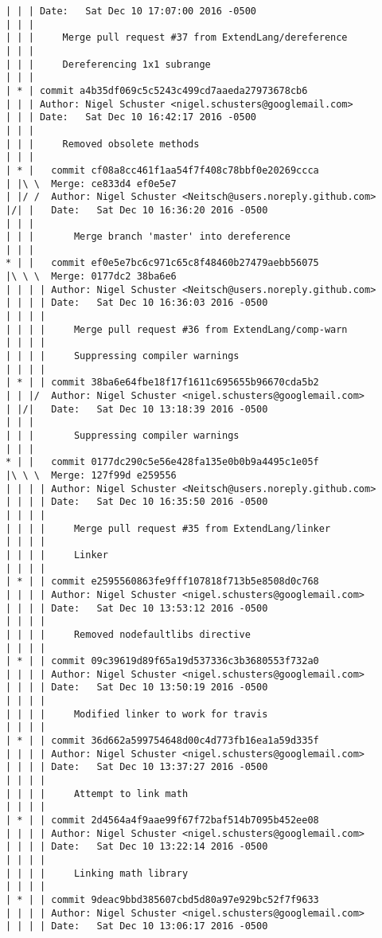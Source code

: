 \begin{lstlisting}
| | | Date:   Sat Dec 10 17:07:00 2016 -0500
| | | 
| | |     Merge pull request #37 from ExtendLang/dereference
| | |     
| | |     Dereferencing 1x1 subrange
| | |    
| * | commit a4b35df069c5c5243c499cd7aaeda27973678cb6
| | | Author: Nigel Schuster <nigel.schusters@googlemail.com>
| | | Date:   Sat Dec 10 16:42:17 2016 -0500
| | | 
| | |     Removed obsolete methods
| | |      
| * |   commit cf08a8cc461f1aa54f7f408c78bbf0e20269ccca
| |\ \  Merge: ce833d4 ef0e5e7
| |/ /  Author: Nigel Schuster <Neitsch@users.noreply.github.com>
|/| |   Date:   Sat Dec 10 16:36:20 2016 -0500
| | |   
| | |       Merge branch 'master' into dereference
| | |      
* | |   commit ef0e5e7bc6c971c65c8f48460b27479aebb56075
|\ \ \  Merge: 0177dc2 38ba6e6
| | | | Author: Nigel Schuster <Neitsch@users.noreply.github.com>
| | | | Date:   Sat Dec 10 16:36:03 2016 -0500
| | | | 
| | | |     Merge pull request #36 from ExtendLang/comp-warn
| | | |     
| | | |     Suppressing compiler warnings
| | | |     
| * | | commit 38ba6e64fbe18f17f1611c695655b96670cda5b2
| | |/  Author: Nigel Schuster <nigel.schusters@googlemail.com>
| |/|   Date:   Sat Dec 10 13:18:39 2016 -0500
| | |   
| | |       Suppressing compiler warnings
| | |      
* | |   commit 0177dc290c5e56e428fa135e0b0b9a4495c1e05f
|\ \ \  Merge: 127f99d e259556
| | | | Author: Nigel Schuster <Neitsch@users.noreply.github.com>
| | | | Date:   Sat Dec 10 16:35:50 2016 -0500
| | | | 
| | | |     Merge pull request #35 from ExtendLang/linker
| | | |     
| | | |     Linker
| | | |     
| * | | commit e2595560863fe9fff107818f713b5e8508d0c768
| | | | Author: Nigel Schuster <nigel.schusters@googlemail.com>
| | | | Date:   Sat Dec 10 13:53:12 2016 -0500
| | | | 
| | | |     Removed nodefaultlibs directive
| | | |     
| * | | commit 09c39619d89f65a19d537336c3b3680553f732a0
| | | | Author: Nigel Schuster <nigel.schusters@googlemail.com>
| | | | Date:   Sat Dec 10 13:50:19 2016 -0500
| | | | 
| | | |     Modified linker to work for travis
| | | |     
| * | | commit 36d662a599754648d00c4d773fb16ea1a59d335f
| | | | Author: Nigel Schuster <nigel.schusters@googlemail.com>
| | | | Date:   Sat Dec 10 13:37:27 2016 -0500
| | | | 
| | | |     Attempt to link math
| | | |     
| * | | commit 2d4564a4f9aae99f67f72baf514b7095b452ee08
| | | | Author: Nigel Schuster <nigel.schusters@googlemail.com>
| | | | Date:   Sat Dec 10 13:22:14 2016 -0500
| | | | 
| | | |     Linking math library
| | | |     
| * | | commit 9deac9bbd385607cbd5d80a97e929bc52f7f9633
| | | | Author: Nigel Schuster <nigel.schusters@googlemail.com>
| | | | Date:   Sat Dec 10 13:06:17 2016 -0500

\end{lstlisting}

